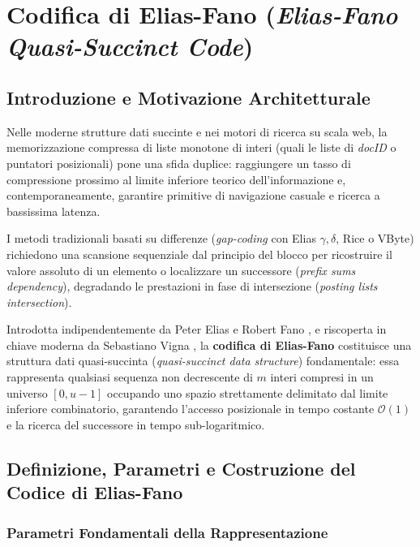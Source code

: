 \chapter{Codifica di Elias-Fano (\textit{Elias-Fano Quasi-Succinct Code})}
\label{ch:elias-fano-code}

\section{Introduzione e Motivazione Architetturale}
\label{sec:intro-elias-fano}

Nelle moderne strutture dati succinte e nei motori di ricerca su scala web, la memorizzazione compressa di liste monotone di interi (quali le liste di \textit{docID} o puntatori posizionali) pone una sfida duplice: raggiungere un tasso di compressione prossimo al limite inferiore teorico dell'informazione e, contemporaneamente, garantire primitive di navigazione casuale e ricerca a bassissima latenza.

I metodi tradizionali basati su differenze (\textit{gap-coding} con Elias $\gamma, \delta$, Rice o VByte) richiedono una scansione sequenziale dal principio del blocco per ricostruire il valore assoluto di un elemento o localizzare un successore (\textit{prefix sums dependency}), degradando le prestazioni in fase di intersezione (\textit{posting lists intersection}).

Introdotta indipendentemente da Peter Elias \cite{elias1975} e Robert Fano \cite{fano1971eliasfano}, e riscoperta in chiave moderna da Sebastiano Vigna \cite{vigna2013eliasfano}, la \textbf{codifica di Elias-Fano} costituisce una struttura dati quasi-succinta (\textit{quasi-succinct data structure}) fondamentale: essa rappresenta qualsiasi sequenza non decrescente di $m$ interi compresi in un universo $[0, u - 1]$ occupando uno spazio strettamente delimitato dal limite inferiore combinatorio, garantendo l'accesso posizionale in tempo costante $\mathcal{O}(1)$ e la ricerca del successore in tempo sub-logaritmico.

\FloatBarrier
\section{Definizione, Parametri e Costruzione del Codice di Elias-Fano}
\label{sec:costruzione-elias-fano}

\subsection{Parametri Fondamentali della Rappresentazione}
\label{subsec:parametri-fondamentali-ef}

